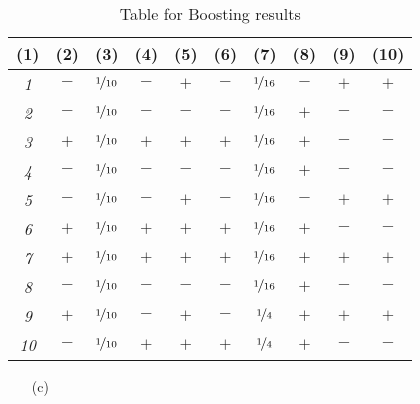 \begin{enumerate}
\begin{table}[!t]
{\begin{tabular}{|c|c||c|c|c|c||c|c|c|c|}
          \tiny{(1)} & \tiny{(2)} & \tiny{(3)} & \tiny{(4)} &  \tiny{(5)} & \tiny{(6)} & \tiny{(7)} & \tiny{(8)} & \tiny{(9)} & \tiny{(10)}\\
          \hline \hline
          {\em 1} & $-$ &$\nicefrac{1}{10}$ &$-$ &$+$ &$-$ &$\nicefrac{1}{16}$ &$-$ &$+$ &$+$  \\
          \hline                                                                             
          {\em 2} & $-$ &$\nicefrac{1}{10}$ &$-$ &$-$ &$-$ &$\nicefrac{1}{16}$ &$+$ &$-$ &$-$  \\
          \hline                                                                             
          {\em 3} & $+$ &$\nicefrac{1}{10}$ &$+$ &$+$ &$+$ &$\nicefrac{1}{16}$ &$+$ &$-$ &$-$ \\
          \hline                                                                             
          {\em 4} & $-$ &$\nicefrac{1}{10}$ &$-$ &$-$ &$-$ &$\nicefrac{1}{16}$ &$+$ &$-$ &$-$ \\
          \hline                                                                             
          {\em 5} & $-$ &$\nicefrac{1}{10}$ &$-$ &$+$ &$-$ &$\nicefrac{1}{16}$ &$-$ &$+$ &$+$ \\
          \hline                                                                             
          {\em 6} & $+$ &$\nicefrac{1}{10}$ &$+$ &$+$ &$+$ &$\nicefrac{1}{16}$ &$+$ &$-$ &$-$ \\
          \hline                                                                             
          {\em 7} & $+$ &$\nicefrac{1}{10}$ &$+$ &$+$ &$+$ &$\nicefrac{1}{16}$ &$+$ &$+$ &$+$ \\
          \hline                                                                             
          {\em 8} & $-$ &$\nicefrac{1}{10}$ &$-$ &$-$ &$-$ &$\nicefrac{1}{16}$ &$+$ &$-$ &$-$ \\
          \hline                                      
          {\em 9} & $+$ &$\nicefrac{1}{10}$ &$-$ &$+$ &$-$ &$\nicefrac{1}{4}$ &$+$ &$+$ &$+$ \\
          \hline
          {\em 10} & $-$ &$\nicefrac{1}{10}$ &$+$ &$+$ &$+$ &$\nicefrac{1}{4}$ &$+$ &$-$ &$-$ \\
          \hline
        \end{tabular}
        \caption{Table for Boosting results} \label{table:ltu}}
    \end{table}      
  \begin{enumerate}
    \item[(c)]

\end{enumerate}
\end{enumerate}
